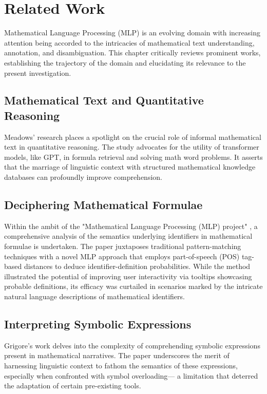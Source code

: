 \chapter{Related Work}\label{chapter:related_work}

Mathematical Language Processing (MLP) is an evolving domain with increasing attention being accorded to the intricacies of mathematical text understanding, annotation, and disambiguation. This chapter critically reviews prominent works, establishing the trajectory of the domain and elucidating its relevance to the present investigation.

\section{Mathematical Text and Quantitative Reasoning}

Meadows' research \parencite{meadows2022survey} places a spotlight on the crucial role of informal mathematical text in quantitative reasoning. The study advocates for the utility of transformer models, like GPT, in formula retrieval and solving math word problems. It asserts that the marriage of linguistic context with structured mathematical knowledge databases can profoundly improve comprehension.

\section{Deciphering Mathematical Formulae}

Within the ambit of the "Mathematical Language Processing (MLP) project" \parencite{pagael2014mathematical}, a comprehensive analysis of the semantics underlying identifiers in mathematical formulae is undertaken. The paper juxtaposes traditional pattern-matching techniques with a novel MLP approach that employs part-of-speech (POS) tag-based distances to deduce identifier-definition probabilities. While the method illustrated the potential of improving user interactivity via tooltips showcasing probable definitions, its efficacy was curtailed in scenarios marked by the intricate natural language descriptions of mathematical identifiers.

\section{Interpreting Symbolic Expressions}

Grigore's work \parencite{grigore2009towards} delves into the complexity of comprehending symbolic expressions present in mathematical narratives. The paper underscores the merit of harnessing linguistic context to fathom the semantics of these expressions, especially when confronted with symbol overloading— a limitation that deterred the adaptation of certain pre-existing tools.

